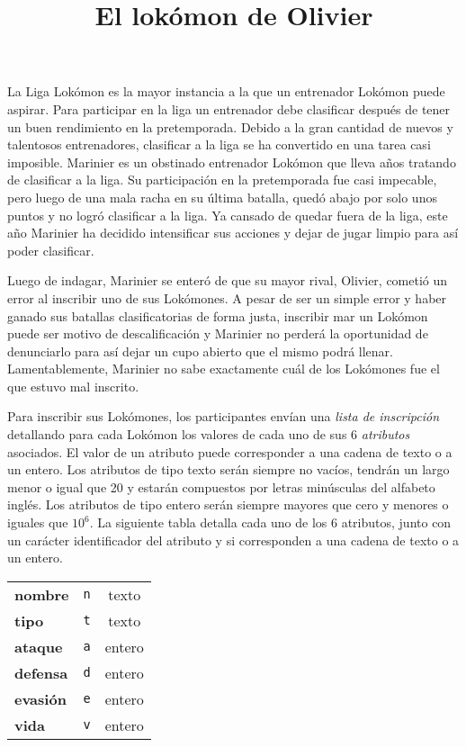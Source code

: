\documentclass{oci}
\title{El lokómon de Olivier}
\begin{document}
\begin{problemDescription}
La Liga Lokómon es la mayor instancia a la que un entrenador Lokómon puede aspirar.
Para participar en la liga un entrenador debe clasificar después de tener un buen
rendimiento en la pretemporada.
Debido a la gran cantidad de nuevos y talentosos entrenadores, clasificar a la liga
se ha convertido en una tarea casi imposible.
Marinier es un obstinado entrenador Lokómon que lleva años tratando de clasificar a la liga.
Su participación en la pretemporada fue casi impecable, pero luego de una mala racha
en su última batalla, quedó abajo por solo unos puntos y no logró clasificar a la liga.
Ya cansado de quedar fuera de la liga, este año Marinier ha decidido intensificar sus
acciones y dejar de jugar limpio para así poder clasificar.

Luego de indagar, Marinier se enteró de que su mayor rival, Olivier, cometió
un error al inscribir uno de sus Lokómones.
A pesar de ser un simple error y haber ganado sus batallas clasificatorias de
forma justa, inscribir mar un Lokómon puede ser motivo de descalificación y
Marinier no perderá la oportunidad de denunciarlo para así dejar un cupo abierto
que el mismo podrá llenar.
Lamentablemente, Marinier no sabe exactamente cuál de los Lokómones fue el que
estuvo mal inscrito.

Para inscribir sus Lokómones, los participantes envían una \emph{lista de inscripción}
detallando para cada Lokómon los valores de cada uno de sus 6 \emph{atributos} asociados.
El valor de un atributo puede corresponder a una cadena de texto o a un entero.
Los atributos de tipo texto serán siempre no vacíos, tendrán un largo menor o
igual que 20 y estarán compuestos por letras minúsculas del alfabeto inglés.
Los atributos de tipo entero serán siempre mayores que cero y menores o iguales
que $10^6$.
La siguiente tabla detalla cada uno de los 6 atributos, junto con un carácter identificador
del atributo y si corresponden a una cadena de texto o a un entero.
\begin{center}
\begin{tabular}{lcc}
	\toprule
	\textbf{nombre } & \texttt{n} & texto \\
	\textbf{tipo   } & \texttt{t} & texto \\
	\textbf{ataque } & \texttt{a} & entero \\
	\textbf{defensa} & \texttt{d} & entero \\
	\textbf{evasión} & \texttt{e} & entero \\
	\textbf{vida   } & \texttt{v} & entero\\
	\bottomrule
\end{tabular}
\end{center}


\end{problemDescription}
\end{document}
